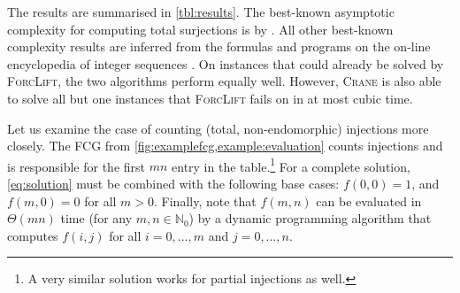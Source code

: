 The results are summarised in \cref{tbl:results}. The best-known asymptotic
complexity for computing total surjections is by \citet{30049}. All other
best-known complexity results are inferred from the formulas and programs on the
on-line encyclopedia of integer sequences \citep{oeis}. On instances that could
already be solved by \textsc{ForcLift}, the two algorithms perform equally well.
However, \textsc{Crane} is also able to solve all but one instances that
\textsc{ForcLift} fails on in at most cubic time.

Let us examine the case of counting (total, non-endomorphic) injections more
closely. The FCG from \cref{fig:examplefcg,example:evaluation} counts injections
and is responsible for the first $mn$ entry in the table.\footnote{A very
  similar solution works for partial injections as well.} For a complete
solution, \cref{eq:solution} must be combined with the following base cases:
$f(0, 0) = 1$, and $f(m, 0) = 0$ for all $m > 0$. Finally, note that $f(m, n)$
can be evaluated in $\Theta(mn)$ time (for any $m, n \in \mathbb{N}_{0}$) by a
dynamic programming algorithm that computes $f(i, j)$ for all $i = 0, \dots, m$
and $j = 0, \dots, n$.




